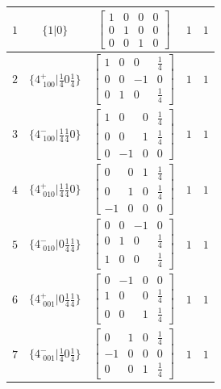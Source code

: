 \documentclass[fleqn,8pt]{jsarticle}
\begin{document}
\begin{longtable}{ccccc}
$ 1 $ & $ \{1|0\} $ & $ \begin{bmatrix} 1 & 0 & 0 & 0 \\ 0 & 1 & 0 & 0 \\ 0 & 0 & 1 & 0 \end{bmatrix} $ & $ 1 $ & $ 1 $ \\ \hline
$ 2 $ & $ \{4^{+}_{\,\,100}|\frac{1}{4} 0 \frac{1}{4}\} $ & $ \begin{bmatrix} 1 & 0 & 0 & \frac{1}{4} \\ 0 & 0 & -1 & 0 \\ 0 & 1 & 0 & \frac{1}{4} \end{bmatrix} $ & $ 1 $ & $ 1 $ \\ \hline
$ 3 $ & $ \{4^{-}_{\,\,100}|\frac{1}{4} \frac{1}{4} 0\} $ & $ \begin{bmatrix} 1 & 0 & 0 & \frac{1}{4} \\ 0 & 0 & 1 & \frac{1}{4} \\ 0 & -1 & 0 & 0 \end{bmatrix} $ & $ 1 $ & $ 1 $ \\ \hline
$ 4 $ & $ \{4^{+}_{\,\,010}|\frac{1}{4} \frac{1}{4} 0\} $ & $ \begin{bmatrix} 0 & 0 & 1 & \frac{1}{4} \\ 0 & 1 & 0 & \frac{1}{4} \\ -1 & 0 & 0 & 0 \end{bmatrix} $ & $ 1 $ & $ 1 $ \\ \hline
$ 5 $ & $ \{4^{-}_{\,\,010}|0 \frac{1}{4} \frac{1}{4}\} $ & $ \begin{bmatrix} 0 & 0 & -1 & 0 \\ 0 & 1 & 0 & \frac{1}{4} \\ 1 & 0 & 0 & \frac{1}{4} \end{bmatrix} $ & $ 1 $ & $ 1 $ \\ \hline
$ 6 $ & $ \{4^{+}_{\,\,001}|0 \frac{1}{4} \frac{1}{4}\} $ & $ \begin{bmatrix} 0 & -1 & 0 & 0 \\ 1 & 0 & 0 & \frac{1}{4} \\ 0 & 0 & 1 & \frac{1}{4} \end{bmatrix} $ & $ 1 $ & $ 1 $ \\ \hline
$ 7 $ & $ \{4^{-}_{\,\,001}|\frac{1}{4} 0 \frac{1}{4}\} $ & $ \begin{bmatrix} 0 & 1 & 0 & \frac{1}{4} \\ -1 & 0 & 0 & 0 \\ 0 & 0 & 1 & \frac{1}{4} \end{bmatrix} $ & $ 1 $ & $ 1 $ \\ \hline

\end{longtable}
\end{document}
